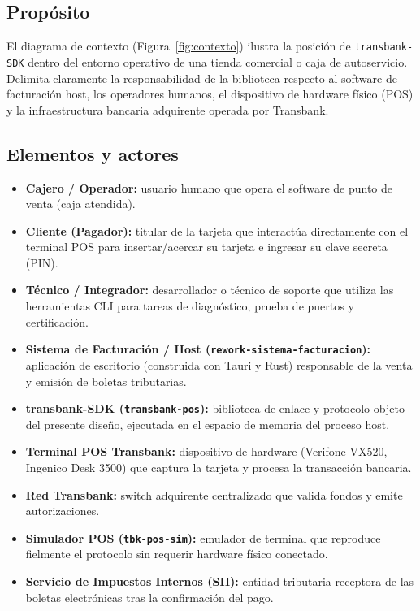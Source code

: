 \documentclass{../../plantilla/raysac-informe}
\begin{document}
\subsection{Propósito}
El diagrama de contexto (Figura~\ref{fig:contexto}) ilustra la posición de \texttt{transbank-SDK}
dentro del entorno operativo de una tienda comercial o caja de autoservicio. Delimita claramente la
responsabilidad de la biblioteca respecto al software de facturación host, los operadores humanos, el
dispositivo de hardware físico (POS) y la infraestructura bancaria adquirente operada por Transbank.

\subsection{Elementos y actores}
\begin{itemize}
  \item \textbf{Cajero / Operador:} usuario humano que opera el software de punto de venta (caja atendida).
  \item \textbf{Cliente (Pagador):} titular de la tarjeta que interactúa directamente con el terminal POS
    para insertar/acercar su tarjeta e ingresar su clave secreta (PIN).
  \item \textbf{Técnico / Integrador:} desarrollador o técnico de soporte que utiliza las herramientas CLI
    para tareas de diagnóstico, prueba de puertos y certificación.
  \item \textbf{Sistema de Facturación / Host (\texttt{rework-sistema-facturacion}):} aplicación de escritorio
    (construida con Tauri y Rust) responsable de la venta y emisión de boletas tributarias.
  \item \textbf{transbank-SDK (\texttt{transbank-pos}):} biblioteca de enlace y protocolo objeto del presente
    diseño, ejecutada en el espacio de memoria del proceso host.
  \item \textbf{Terminal POS Transbank:} dispositivo de hardware (Verifone VX520, Ingenico Desk 3500) que
    captura la tarjeta y procesa la transacción bancaria.
  \item \textbf{Red Transbank:} switch adquirente centralizado que valida fondos y emite autorizaciones.
  \item \textbf{Simulador POS (\texttt{tbk-pos-sim}):} emulador de terminal que reproduce fielmente el
    protocolo sin requerir hardware físico conectado.
  \item \textbf{Servicio de Impuestos Internos (SII):} entidad tributaria receptora de las boletas
    electrónicas tras la confirmación del pago.
\end{itemize}
\end{document}
